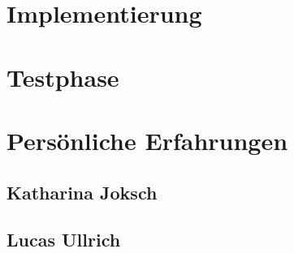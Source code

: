 \section{Implementierung}

\section{Testphase}

\section{Persönliche Erfahrungen}

  \subsection{Katharina Joksch}

  \subsection{Lucas Ullrich}
